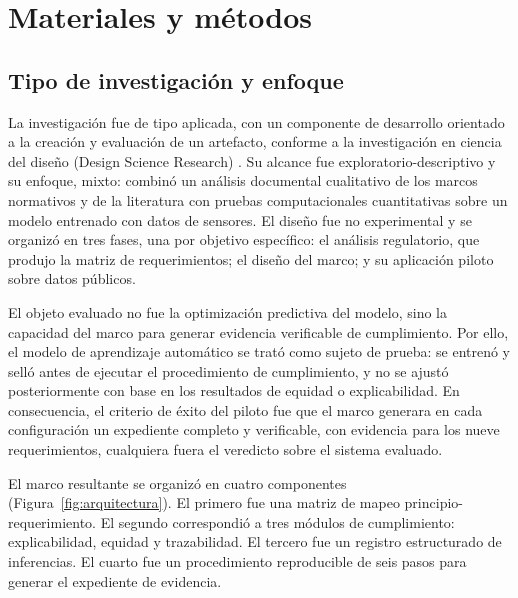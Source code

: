 
\section{Materiales y métodos}

\subsection{Tipo de investigación y enfoque}

La investigación fue de tipo aplicada, con un componente de desarrollo
orientado a la creación y evaluación de un artefacto, conforme a la
investigación en ciencia del diseño (Design Science Research)
\cite{hevner2004dsr}. Su alcance fue exploratorio-descriptivo y su enfoque,
mixto: combinó un análisis documental cualitativo de los marcos normativos y de
la literatura con pruebas computacionales cuantitativas sobre un modelo
entrenado con datos de sensores. El diseño fue no experimental y se organizó en
tres fases, una por objetivo específico: el análisis regulatorio, que produjo la
matriz de requerimientos; el diseño del marco; y su aplicación piloto sobre
datos públicos.

El objeto
evaluado no fue la optimización predictiva del modelo, sino la capacidad del
marco para generar evidencia verificable de cumplimiento. Por ello, el modelo de
aprendizaje automático se trató como sujeto de prueba: se entrenó y selló antes
de ejecutar el procedimiento de cumplimiento, y no se ajustó posteriormente con
base en los resultados de equidad o explicabilidad. En consecuencia, el criterio
de éxito del piloto fue que el marco generara en cada configuración un expediente
completo y verificable, con evidencia para los nueve requerimientos, cualquiera
fuera el veredicto sobre el sistema evaluado.

El marco resultante se organizó en cuatro componentes
(Figura~\ref{fig:arquitectura}). El primero fue una matriz de
mapeo principio-requerimiento. El segundo correspondió a tres módulos de
cumplimiento: explicabilidad, equidad y trazabilidad. El tercero fue un registro
estructurado de inferencias. El cuarto fue un procedimiento reproducible de seis
pasos para generar el expediente de evidencia.

